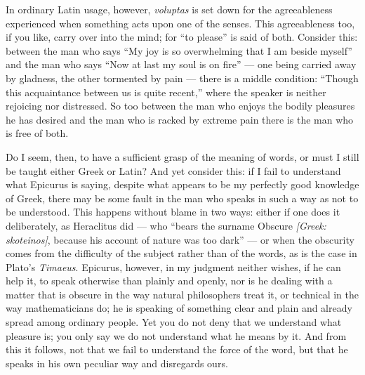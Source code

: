  In ordinary Latin usage, however, \textit{voluptas} is set down for the agreeableness experienced when something acts upon one of the senses. This agreeableness too, if you like, carry over into the mind; for ``to please'' is said of both. Consider this: between the man who says ``My joy is so overwhelming that I am beside myself'' and the man who says ``Now at last my soul is on fire'' — one being carried away by gladness, the other tormented by pain — there is a middle condition: ``Though this acquaintance between us is quite recent,'' where the speaker is neither rejoicing nor distressed. So too between the man who enjoys the bodily pleasures he has desired and the man who is racked by extreme pain there is the man who is free of both.

 Do I seem, then, to have a sufficient grasp of the meaning of words, or must I still be taught either Greek or Latin? And yet consider this: if I fail to understand what Epicurus is saying, despite what appears to be my perfectly good knowledge of Greek, there may be some fault in the man who speaks in such a way as not to be understood. This happens without blame in two ways: either if one does it deliberately, as Heraclitus did — who ``bears the surname Obscure \textit{[Greek: skoteinos]}, because his account of nature was too dark'' — or when the obscurity comes from the difficulty of the subject rather than of the words, as is the case in Plato's \textit{Timaeus}. Epicurus, however, in my judgment neither wishes, if he can help it, to speak otherwise than plainly and openly, nor is he dealing with a matter that is obscure in the way natural philosophers treat it, or technical in the way mathematicians do; he is speaking of something clear and plain and already spread among ordinary people. Yet you do not deny that we understand what pleasure is; you only say we do not understand what he means by it. And from this it follows, not that we fail to understand the force of the word, but that he speaks in his own peculiar way and disregards ours.



